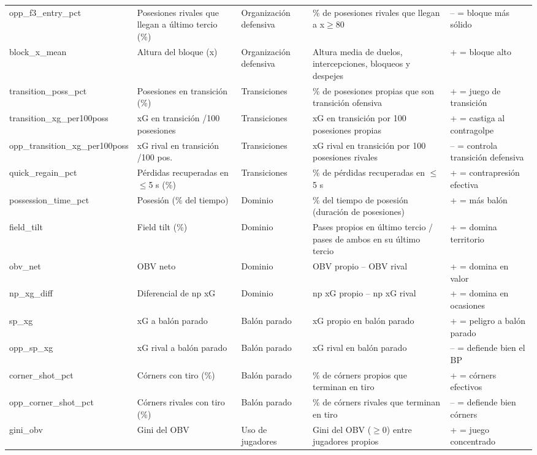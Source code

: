 {\begin{longtable}{p{3.4cm} p{3.3cm} p{2.2cm} p{5.2cm} p{2.6cm}}
opp\_f3\_entry\_pct & Posesiones rivales que llegan a último tercio (\%) & Organización defensiva & \% de posesiones rivales que llegan a x$\geq$80 & -- = bloque más sólido \\
block\_x\_mean & Altura del bloque (x) & Organización defensiva & Altura media de duelos, intercepciones, bloqueos y despejes & + = bloque alto \\
transition\_poss\_pct & Posesiones en transición (\%) & Transiciones & \% de posesiones propias que son transición ofensiva & + = juego de transición \\
transition\_xg\_per100poss & xG en transición /100 posesiones & Transiciones & xG en transición por 100 posesiones propias & + = castiga al contragolpe \\
opp\_transition\_xg\_per100poss & xG rival en transición /100 pos. & Transiciones & xG rival en transición por 100 posesiones rivales & -- = controla transición defensiva \\
quick\_regain\_pct & Pérdidas recuperadas en $\leq$5 s (\%) & Transiciones & \% de pérdidas recuperadas en $\leq$ 5 s & + = contrapresión efectiva \\
possession\_time\_pct & Posesión (\% del tiempo) & Dominio & \% del tiempo de posesión (duración de posesiones) & + = más balón \\
field\_tilt & Field tilt (\%) & Dominio & Pases propios en último tercio / pases de ambos en su último tercio & + = domina territorio \\
obv\_net & OBV neto & Dominio & OBV propio -- OBV rival & + = domina en valor \\
np\_xg\_diff & Diferencial de np xG & Dominio & np xG propio -- np xG rival & + = domina en ocasiones \\
sp\_xg & xG a balón parado & Balón parado & xG propio en balón parado & + = peligro a balón parado \\
opp\_sp\_xg & xG rival a balón parado & Balón parado & xG rival en balón parado & -- = defiende bien el BP \\
corner\_shot\_pct & Córners con tiro (\%) & Balón parado & \% de córners propios que terminan en tiro & + = córners efectivos \\
opp\_corner\_shot\_pct & Córners rivales con tiro (\%) & Balón parado & \% de córners rivales que terminan en tiro & -- = defiende bien córners \\
gini\_obv & Gini del OBV & Uso de jugadores & Gini del OBV ($\geq$0) entre jugadores propios & + = juego concentrado \\

\end{longtable}}
